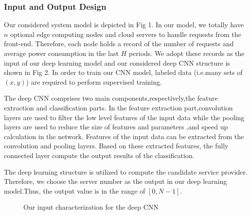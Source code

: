 \documentclass[twoside,twocolumn]{article}
\begin{document}
\subsubsection{Input and Output Design}
Our considered system model is depicted in Fig 1. In our model, we totally have $n$ optional edge computing nodes and cloud servers to handle requests from the front-end. Therefore, each node holds a record of the number of requests and average power consumption in the last $\mathit{H}$ periods. We adopt these records as the input of our deep learning model and our considered deep CNN structure is shown in Fig 2. In order to train our CNN model, labeled data (i.e.many sets of $(x,y)$) are required to perform supervised training.

The deep CNN comprises two main components,respectively,the feature extraction and classification parts. In the feature extraction part,convolution layers are used to filter the low level features of the input data while the pooling layers are used to reduce the size of features and parameters ,and speed up calculation in the network. Features of the input data can be extracted from the convolution and pooling layers. Based on these extracted features, the fully connected layer compute the output results of the classification.

The deep learning structure is utilized to compute the candidate service provider. Therefore, we choose the server number as the output in our deep learning model.Thus, the output value is in the range of $[0,N-1]$.


\begin{figure}[h]
\centering
{}
 \caption{Our input characterization for the deep CNN} 
 \label{fig:label}
\end{figure}
\end{document}
